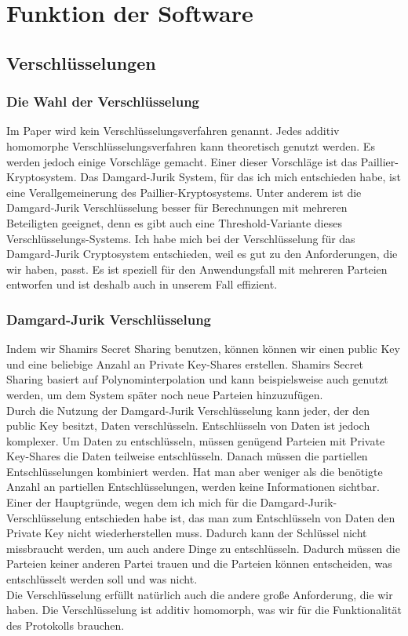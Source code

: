 \chapter{Funktion der Software}

\section{Verschlüsselungen}
\subsection{Die Wahl der Verschlüsselung}
Im Paper \cite{Doettling2021} wird kein Verschlüsselungsverfahren genannt. Jedes additiv homomorphe Verschlüsselungsverfahren kann theoretisch genutzt werden. Es werden jedoch einige Vorschläge  gemacht. Einer dieser Vorschläge ist das Paillier-Kryptosystem. Das Damgard-Jurik System, für das ich mich entschieden habe, ist eine Verallgemeinerung des Paillier-Kryptosystems. Unter anderem ist die Damgard-Jurik Verschlüsselung besser für Berechnungen mit mehreren Beteiligten geeignet, denn es gibt auch eine Threshold-Variante dieses Verschlüsselungs-Systems. \cite{IvanDamgard2004}
Ich habe mich bei der Verschlüsselung für das Damgard-Jurik Cryptosystem entschieden, weil es gut zu den Anforderungen, die wir haben, passt. Es ist speziell für den Anwendungsfall mit mehreren Parteien entworfen und ist deshalb auch in unserem Fall effizient.\\



\subsection{Damgard-Jurik Verschlüsselung}
Indem wir Shamirs Secret Sharing benutzen, können können wir einen public Key und eine beliebige Anzahl an Private Key-Shares erstellen. Shamirs Secret Sharing basiert auf Polynominterpolation und kann beispielsweise auch genutzt werden, um dem System später noch neue Parteien hinzuzufügen.\cite{Shamir1979}\\
Durch die Nutzung der Damgard-Jurik Verschlüsselung kann jeder, der den public Key besitzt, Daten verschlüsseln. Entschlüsseln von Daten ist jedoch komplexer. Um Daten zu entschlüsseln, müssen genügend Parteien mit Private Key-Shares die Daten teilweise entschlüsseln. Danach müssen die partiellen Entschlüsselungen kombiniert werden. Hat man aber weniger als die benötigte Anzahl an partiellen Entschlüsselungen, werden keine Informationen sichtbar. \cite{IvanDamgard2004}\\
Einer der Hauptgründe, wegen dem ich mich für die Damgard-Jurik-Verschlüsselung entschieden habe ist, das man zum Entschlüsseln von Daten den Private Key nicht wiederherstellen muss. Dadurch kann der Schlüssel nicht missbraucht werden, um auch andere Dinge zu entschlüsseln. Dadurch müssen die Parteien keiner anderen Partei trauen und die Parteien können entscheiden, was entschlüsselt werden soll und was nicht. \cite{IvanDamgard2004}\\
Die Verschlüsselung erfüllt natürlich auch die andere große Anforderung, die wir haben. Die Verschlüsselung ist additiv homomorph, was wir für die Funktionalität des Protokolls brauchen. \cite{IvanDamgard2004}


